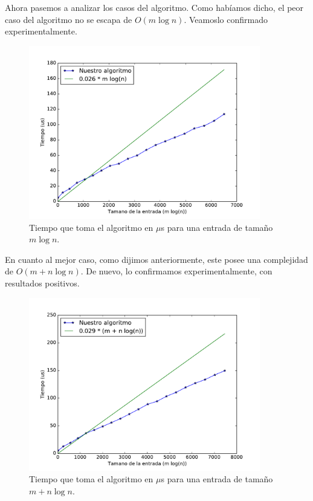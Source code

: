 Ahora pasemos a analizar los casos del algoritmo. Como habíamos dicho, el peor caso del algoritmo no se escapa de $O(m \log n)$. Veamoslo confirmado experimentalmente.

\begin{figure}[H]
 \centering
	\includegraphics[width=0.9\textwidth]{img/exp/problema2-peor.pdf}
	\caption{\footnotesize Tiempo que toma el algoritmo en $\mu$s para una entrada de tamaño $m \log n$.}
	\label{fig:problema2-peor}
\end{figure}


En cuanto al mejor caso, como dijimos anteriormente, este posee una complejidad de $O(m + n \log n)$. De nuevo, lo confirmamos experimentalmente, con resultados positivos.

\begin{figure}[H]
 \centering
	\includegraphics[width=0.9\textwidth]{img/exp/problema2-mejor.pdf}
	\caption{\footnotesize Tiempo que toma el algoritmo en $\mu$s para una entrada de tamaño $m + n \log n$.}
	\label{fig:problema2-mejor}
\end{figure}



